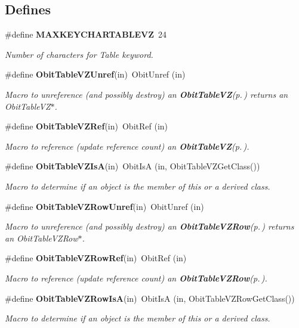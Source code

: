 \subsection*{Defines}
\begin{CompactItemize}
\item 
\#define {\bf MAXKEYCHARTABLEVZ}\ 24
\begin{CompactList}\small\item\em Number of characters for Table keyword. \item\end{CompactList}\item 
\#define {\bf Obit\-Table\-VZUnref}(in)\ Obit\-Unref (in)
\begin{CompactList}\small\item\em Macro to unreference (and possibly destroy) an {\bf Obit\-Table\-VZ}{\rm (p.\,\pageref{structObitTableVZ})} returns an Obit\-Table\-VZ$\ast$. \item\end{CompactList}\item 
\#define {\bf Obit\-Table\-VZRef}(in)\ Obit\-Ref (in)
\begin{CompactList}\small\item\em Macro to reference (update reference count) an {\bf Obit\-Table\-VZ}{\rm (p.\,\pageref{structObitTableVZ})}. \item\end{CompactList}\item 
\#define {\bf Obit\-Table\-VZIs\-A}(in)\ Obit\-Is\-A (in, Obit\-Table\-VZGet\-Class())
\begin{CompactList}\small\item\em Macro to determine if an object is the member of this or a derived class. \item\end{CompactList}\item 
\#define {\bf Obit\-Table\-VZRow\-Unref}(in)\ Obit\-Unref (in)
\begin{CompactList}\small\item\em Macro to unreference (and possibly destroy) an {\bf Obit\-Table\-VZRow}{\rm (p.\,\pageref{structObitTableVZRow})} returns an Obit\-Table\-VZRow$\ast$. \item\end{CompactList}\item 
\#define {\bf Obit\-Table\-VZRow\-Ref}(in)\ Obit\-Ref (in)
\begin{CompactList}\small\item\em Macro to reference (update reference count) an {\bf Obit\-Table\-VZRow}{\rm (p.\,\pageref{structObitTableVZRow})}. \item\end{CompactList}\item 
\#define {\bf Obit\-Table\-VZRow\-Is\-A}(in)\ Obit\-Is\-A (in, Obit\-Table\-VZRow\-Get\-Class())
\begin{CompactList}\small\item\em Macro to determine if an object is the member of this or a derived class. \item\end{CompactList}\end{CompactItemize}
